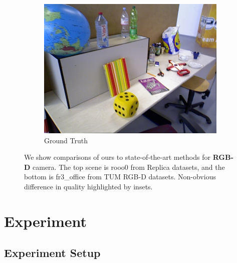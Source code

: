 \begin{figure}[ht]
\begin{subfigure}[t]{0.19\linewidth}
        \includegraphics[width=1\linewidth]{fig/fig_rgbd/tum/fr3/gt/30000_207.jpg}
        \caption{Ground Truth}
        \label{fig:gull}
    \end{subfigure}
	\caption{We show comparisons of ours to state-of-the-art methods for \textbf{RGB-D} camera. The top scene is rooo0 from Replica datasets, and the bottom is fr3\_office from TUM RGB-D datasets. Non-obvious difference in quality highlighted by insets.}
	\label{fig:rendering_rgbd}
\end{figure}



\section{Experiment}

\subsection{Experiment Setup}


